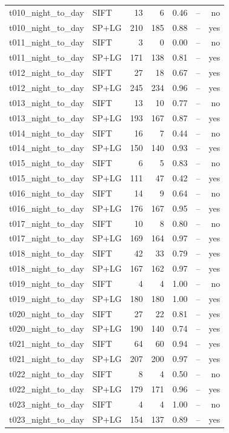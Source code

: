 \begin{longtable}{llrrrrr}
t010\_night\_to\_day & SIFT & 13 & 6 & 0.46 & -- & no \\
t010\_night\_to\_day & SP+LG & 210 & 185 & 0.88 & -- & yes \\
t011\_night\_to\_day & SIFT & 3 & 0 & 0.00 & -- & no \\
t011\_night\_to\_day & SP+LG & 171 & 138 & 0.81 & -- & yes \\
t012\_night\_to\_day & SIFT & 27 & 18 & 0.67 & -- & yes \\
t012\_night\_to\_day & SP+LG & 245 & 234 & 0.96 & -- & yes \\
t013\_night\_to\_day & SIFT & 13 & 10 & 0.77 & -- & no \\
t013\_night\_to\_day & SP+LG & 193 & 167 & 0.87 & -- & yes \\
t014\_night\_to\_day & SIFT & 16 & 7 & 0.44 & -- & no \\
t014\_night\_to\_day & SP+LG & 150 & 140 & 0.93 & -- & yes \\
t015\_night\_to\_day & SIFT & 6 & 5 & 0.83 & -- & no \\
t015\_night\_to\_day & SP+LG & 111 & 47 & 0.42 & -- & yes \\
t016\_night\_to\_day & SIFT & 14 & 9 & 0.64 & -- & no \\
t016\_night\_to\_day & SP+LG & 176 & 167 & 0.95 & -- & yes \\
t017\_night\_to\_day & SIFT & 10 & 8 & 0.80 & -- & no \\
t017\_night\_to\_day & SP+LG & 169 & 164 & 0.97 & -- & yes \\
t018\_night\_to\_day & SIFT & 42 & 33 & 0.79 & -- & yes \\
t018\_night\_to\_day & SP+LG & 167 & 162 & 0.97 & -- & yes \\
t019\_night\_to\_day & SIFT & 4 & 4 & 1.00 & -- & no \\
t019\_night\_to\_day & SP+LG & 180 & 180 & 1.00 & -- & yes \\
t020\_night\_to\_day & SIFT & 27 & 22 & 0.81 & -- & yes \\
t020\_night\_to\_day & SP+LG & 190 & 140 & 0.74 & -- & yes \\
t021\_night\_to\_day & SIFT & 64 & 60 & 0.94 & -- & yes \\
t021\_night\_to\_day & SP+LG & 207 & 200 & 0.97 & -- & yes \\
t022\_night\_to\_day & SIFT & 8 & 4 & 0.50 & -- & no \\
t022\_night\_to\_day & SP+LG & 179 & 171 & 0.96 & -- & yes \\
t023\_night\_to\_day & SIFT & 4 & 4 & 1.00 & -- & no \\
t023\_night\_to\_day & SP+LG & 154 & 137 & 0.89 & -- & yes \\
\end{longtable}\endgroup
